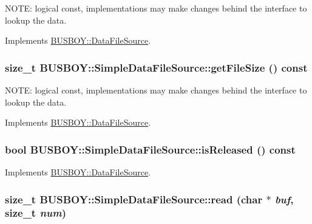 NOTE: logical const, implementations may make changes behind the interface to lookup the data. 

Implements \hyperlink{classBUSBOY_1_1DataFileSource_ada5ea0b760f3cf5a865197d3fb9e4fcd}{BUSBOY::DataFileSource}.\hypertarget{classBUSBOY_1_1SimpleDataFileSource_a3a88ad0f428efbe004f864d67ed642f1}{
\subsubsection[{getFileSize}]{\setlength{\rightskip}{0pt plus 5cm}size\_\-t BUSBOY::SimpleDataFileSource::getFileSize () const}}
\label{classBUSBOY_1_1SimpleDataFileSource_a3a88ad0f428efbe004f864d67ed642f1}


NOTE: logical const, implementations may make changes behind the interface to lookup the data. 

Implements \hyperlink{classBUSBOY_1_1DataFileSource_a79ad2660b524ee38093b7cc72d2924f5}{BUSBOY::DataFileSource}.\hypertarget{classBUSBOY_1_1SimpleDataFileSource_acd353a3343831533682d6f1dd6122573}{
\subsubsection[{isReleased}]{\setlength{\rightskip}{0pt plus 5cm}bool BUSBOY::SimpleDataFileSource::isReleased () const}}
\label{classBUSBOY_1_1SimpleDataFileSource_acd353a3343831533682d6f1dd6122573}


Implements \hyperlink{classBUSBOY_1_1DataFileSource_afd39ef6968c00cc9202c01d68bc87709}{BUSBOY::DataFileSource}.\hypertarget{classBUSBOY_1_1SimpleDataFileSource_ab3d357e13ac2707123f42e32184549d9}{
\subsubsection[{read}]{\setlength{\rightskip}{0pt plus 5cm}size\_\-t BUSBOY::SimpleDataFileSource::read (char $\ast$ {\em buf}, \/  size\_\-t {\em num})}}
\label{classBUSBOY_1_1SimpleDataFileSource_ab3d357e13ac2707123f42e32184549d9}


